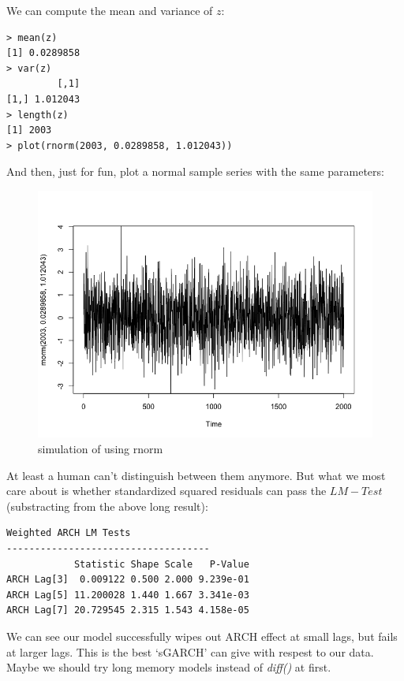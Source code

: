\documentclass[a4paper, 11pt]{article}
\begin{document}
\indent We can compute the mean and variance of $z$:
\begin{verbatim}
> mean(z)
[1] 0.0289858
> var(z)
         [,1]
[1,] 1.012043
> length(z)
[1] 2003
> plot(rnorm(2003, 0.0289858, 1.012043))
\end{verbatim} 
\indent And then, just for fun, plot a normal sample series with the same parameters:

\begin{figure}[H]
\centering
\caption{simulation of using rnorm}
\includegraphics[scale=.40]{rnorm.png}
\end{figure}

\indent At least a human can't distinguish between them anymore. But what we most care about is whether standardized squared residuals can pass the $LM-Test$(substracting from the above long result):

\begin{verbatim}
Weighted ARCH LM Tests
------------------------------------
            Statistic Shape Scale   P-Value
ARCH Lag[3]  0.009122 0.500 2.000 9.239e-01
ARCH Lag[5] 11.200028 1.440 1.667 3.341e-03
ARCH Lag[7] 20.729545 2.315 1.543 4.158e-05
\end{verbatim}

We can see our model successfully wipes out ARCH effect at small lags, but fails at larger lags. This is the best `sGARCH' can give with respest to our data. Maybe we should try long memory models instead of \textit{diff()} at first.\par
\end{document}
